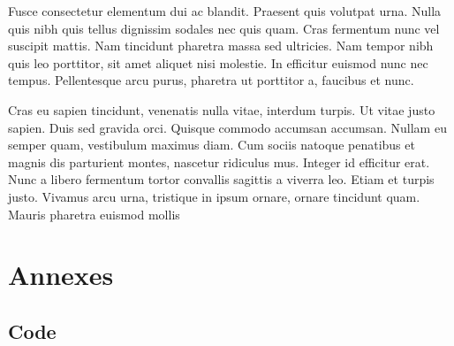 \documentclass{report}
\begin{document}
        Fusce consectetur elementum dui ac blandit. Praesent quis volutpat urna. Nulla quis nibh quis tellus dignissim sodales nec quis quam. Cras fermentum nunc vel suscipit mattis. Nam tincidunt pharetra massa sed ultricies. Nam tempor nibh quis leo porttitor, sit amet aliquet nisi molestie. In efficitur euismod nunc nec tempus. Pellentesque arcu purus, pharetra ut porttitor a, faucibus et nunc.

        Cras eu sapien tincidunt, venenatis nulla vitae, interdum turpis. Ut vitae justo sapien. Duis sed gravida orci. Quisque commodo accumsan accumsan. Nullam eu semper quam, vestibulum maximus diam. Cum sociis natoque penatibus et magnis dis parturient montes, nascetur ridiculus mus. Integer id efficitur erat. Nunc a libero fermentum tortor convallis sagittis a viverra leo. Etiam et turpis justo. Vivamus arcu urna, tristique in ipsum ornare, ornare tincidunt quam. Mauris pharetra euismod mollis

    \appendix
        \chapter{Annexes}
            \section{Code}
\end{document}
